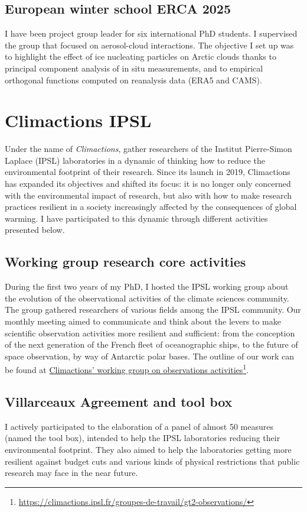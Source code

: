     \subsection*{European winter school ERCA 2025}
    I have been project group leader for six international PhD students. I supervised the group that focused on aerosol-cloud interactions. 
    The objective I set up was to highlight the effect of ice nucleating particles on Arctic clouds thanks to principal component analysis of in situ measurements, and to empirical orthogonal functions computed on reanalysis data (ERA5 and CAMS).

\section*{Climactions IPSL}
    Under the name of \textit{Climactions}, gather researchers of the Institut Pierre-Simon Laplace (IPSL) laboratories in a dynamic of thinking how to reduce the environmental footprint of their research. Since its launch in 2019, Climactions has expanded its objectives and shifted its focus: it is no longer only concerned with the environmental impact of research, but also with how to make research practices resilient in a society increasingly affected by the consequences of  global warming.
    I have participated to this dynamic through different activities presented below.

    \subsection*{Working group research core activities}
    During the first two years of my PhD, I hosted the IPSL working group about the evolution of the observational activities of the climate sciences community.
    The group gathered researchers of various fields among the IPSL community. Our monthly meeting aimed to communicate and think about the levers to make scientific observation activities more resilient and sufficient: from the conception of the next generation of the French fleet of oceanographic ships, to the future of space observation, by way of Antarctic polar bases. 
    The outline of our work can be found at \href{https://climactions.ipsl.fr/groupes-de-travail/gt2-observations/}{Climactions' working group on observations activities}\footnote{\url{https://climactions.ipsl.fr/groupes-de-travail/gt2-observations/}}.


    \subsection*{Villarceaux Agreement and tool box}
    I actively participated to the elaboration of a panel of almost \num{50} measures (named the tool box), intended to help the IPSL laboratories reducing their environmental footprint. They also aimed to help the laboratories getting more resilient against budget cuts and various kinds of physical restrictions that public research may face in the near future. 


